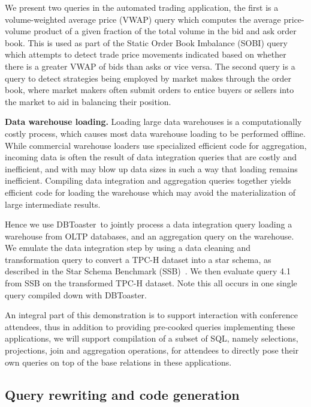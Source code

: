 \documentclass{vldb}
\newcommand{\compiler}{DBToaster}
\begin{document}
We present two queries in the automated trading application, the first is a
volume-weighted average price (VWAP) query which computes the average
price-volume product of a given fraction of the total volume in the bid and
ask order book. This is used as part of the Static Order Book Imbalance (SOBI)
query which attempts to detect trade price movements indicated based on whether
there is a greater VWAP of bids than asks or vice versa. The second query is a
query to detect strategies being employed by market makes through the order
book, where market makers often submit orders to entice buyers or sellers into
the market to aid in balancing their position.

\textbf{Data warehouse loading.}
Loading large data warehouses is a computationally costly process, which
causes most data warehouse loading to be performed offline.
While commercial warehouse loaders use specialized efficient code for 
aggregation, incoming data is often the result of data integration
queries that are costly and inefficient, and with may blow up data sizes
in such a way that loading remains inefficient.
Compiling data integration and aggregation queries together yields efficient
code for loading the warehouse which may avoid the materialization of large
intermediate results.

Hence we use \compiler\ to jointly process a data integration query loading a
warehouse from OLTP databases, and an aggregation query on the warehouse. We
emulate the data integration step by using a data cleaning and transformation
query to convert a TPC-H dataset into a star schema, as described in the Star
Schema Benchmark (SSB)~\cite{poneil-ssb:07}. We then evaluate query 4.1 from SSB
on the transformed TPC-H dataset. Note this all occurs in one single query
compiled down with \compiler.

An integral part of this demonstration is to support interaction with conference
attendees, thus in addition to providing pre-cooked queries implementing these
applications, we will support compilation of a subset of SQL, namely selections,
projections, join and aggregation operations, for attendees to directly pose
their own queries on top of the base relations in these applications.




\subsection{Query rewriting and code generation}
\end{document}
